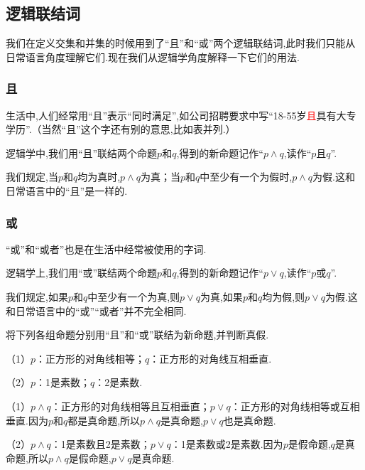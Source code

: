 \documentclass[lang=cn,math=cm,chinesefont=nofont,11pt,scheme=chinese,twocol]{elegantbook}
\begin{document}
\subsection{逻辑联结词}

我们在定义交集和并集的时候用到了“且”和“或”两个逻辑联结词,此时我们只能从日常语言角度理解它们.现在我们从逻辑学角度解释一下它们的用法.

\subsubsection{且}

生活中,人们经常用“且”表示“同时满足”,如公司招聘要求中写“18-55岁\textcolor{red}{且}具有大专学历”.（当然“且”这个字还有别的意思,比如表并列.）

逻辑学中,我们用“且”联结两个命题$p$和$q$,得到的新命题记作“$p\land q$,读作“$p$且$q$”.

我们规定,当$p$和$q$均为真时,$p\land q$为真；当$p$和$q$中至少有一个为假时,$p\land q$为假.这和日常语言中的“且”是一样的.

\subsubsection{或}

“或”和“或者”也是在生活中经常被使用的字词.

逻辑学上,我们用“或”联结两个命题$p$和$q$,得到的新命题记作“$p\lor q$,读作“$p$或$q$”.

我们规定,如果$p$和$q$中至少有一个为真,则$p\lor q$为真,如果$p$和$q$均为假,则$p\lor q$为假.这和日常语言中的“或”“或者”并不完全相同.

\hspace*{\fill}

\begin{example}
  将下列各组命题分别用“且”和“或”联结为新命题,并判断真假.
\end{example}

（1）$p$：正方形的对角线相等；$q$：正方形的对角线互相垂直.

（2）$p$：1是素数；$q$：2是素数.

\begin{solution}
  （1）$p\land q$：正方形的对角线相等且互相垂直；$p\lor q$：正方形的对角线相等或互相垂直.因为$p$和$q$都是真命题,所以$p\land q$是真命题,$p\lor q$也是真命题.

  （2）$p\land q$：1是素数且2是素数；$p\lor q$：1是素数或2是素数.因为$p$是假命题,$q$是真命题,所以$p\land q$是假命题,$p\lor q$是真命题.
\end{solution}
\end{document}
